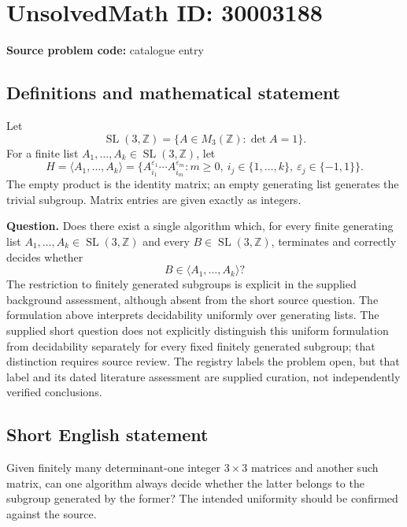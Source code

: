 \documentclass[11pt]{article}
\newcommand{\Z}{\mathbb{Z}}
\begin{document}
\section*{UnsolvedMath ID: 30003188}
\textbf{Source problem code:} catalogue entry
\subsection{Definitions and mathematical statement}
Let
\[
\operatorname{SL}(3,\Z)=\{A\in M_3(\Z):\det A=1\}.
\]
For a finite list \(A_1,\ldots,A_k\in\operatorname{SL}(3,\Z)\), let
\[
H=\langle A_1,\ldots,A_k\rangle
=\{A_{i_1}^{\varepsilon_1}\cdots A_{i_m}^{\varepsilon_m}:m\geq0,\ i_j\in\{1,\ldots,k\},\ \varepsilon_j\in\{-1,1\}\}.
\]
The empty product is the identity matrix; an empty generating list generates the trivial subgroup. Matrix entries are given exactly as integers.

\textbf{Question.} Does there exist a single algorithm which, for every finite generating list \(A_1,\ldots,A_k\in\operatorname{SL}(3,\Z)\) and every \(B\in\operatorname{SL}(3,\Z)\), terminates and correctly decides whether
\[
B\in\langle A_1,\ldots,A_k\rangle?
\]
The restriction to finitely generated subgroups is explicit in the supplied background assessment, although absent from the short source question. The formulation above interprets decidability uniformly over generating lists. The supplied short question does not explicitly distinguish this uniform formulation from decidability separately for every fixed finitely generated subgroup; that distinction requires source review. The registry labels the problem open, but that label and its dated literature assessment are supplied curation, not independently verified conclusions.
\subsection{Short English statement}
Given finitely many determinant-one integer \(3\times3\) matrices and another such matrix, can one algorithm always decide whether the latter belongs to the subgroup generated by the former? The intended uniformity should be confirmed against the source.
\end{document}

